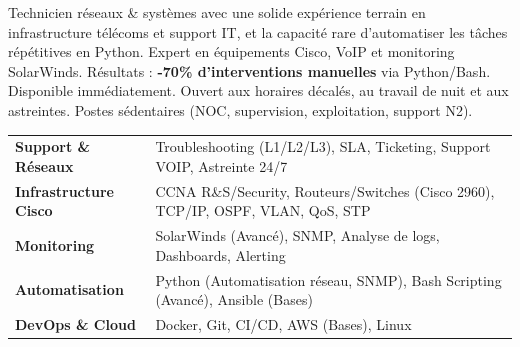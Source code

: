 \documentclass[11pt,a4paper]{article}
\begin{document}

Technicien réseaux \& systèmes avec une solide expérience terrain en infrastructure télécoms et support IT, et la capacité rare d'automatiser les tâches répétitives en Python. Expert en équipements Cisco, VoIP et monitoring SolarWinds. Résultats : \textbf{-70\% d'interventions manuelles} via Python/Bash. Disponible immédiatement. Ouvert aux horaires décalés, au travail de nuit et aux astreintes. Postes sédentaires (NOC, supervision, exploitation, support N2).

\noindent
\begin{tabularx}{\linewidth}{@{} p{3.5cm} X @{}}
\textbf{Support \& Réseaux} & Troubleshooting (L1/L2/L3), SLA, Ticketing, Support VOIP, Astreinte 24/7 \\
\textbf{Infrastructure Cisco} & CCNA R\&S/Security, Routeurs/Switches (Cisco 2960), TCP/IP, OSPF, VLAN, QoS, STP \\
\textbf{Monitoring} & SolarWinds (Avancé), SNMP, Analyse de logs, Dashboards, Alerting \\
\textbf{Automatisation} & Python (Automatisation réseau, SNMP), Bash Scripting (Avancé), Ansible (Bases) \\
\textbf{DevOps \& Cloud} & Docker, Git, CI/CD, AWS (Bases), Linux \\
\end{tabularx}
\end{document}
